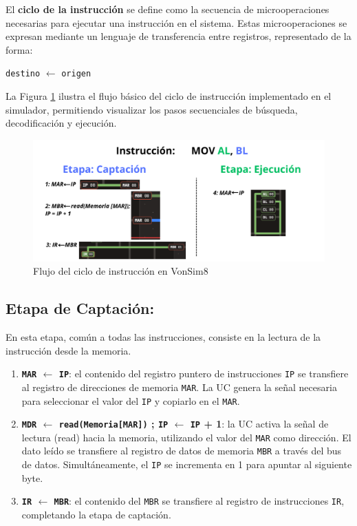 \documentclass[12pt,oneside]{templates/unerthesis}
\providecommand{\tightlist}{%
  \setlength{\itemsep}{0pt}\setlength{\parskip}{0pt}}
\begin{document}
El \textbf{ciclo de la instrucción} se define como la secuencia de microoperaciones necesarias para ejecutar una instrucción en el sistema. Estas microoperaciones se expresan mediante un lenguaje de transferencia entre registros, representado de la forma:

\texttt{destino} \(\leftarrow\) \texttt{origen}

La Figura \ref{fig:flujoCicloInstruccion} ilustra el flujo básico del ciclo de instrucción implementado en el simulador, permitiendo visualizar los pasos secuenciales de búsqueda, decodificación y ejecución.

\begin{figure}

{\centering \includegraphics[width=0.85\linewidth]{images/cicloinstruccion2} 

}

\caption{Flujo del ciclo de instrucción en VonSim8}\label{fig:flujoCicloInstruccion}
\end{figure}

\hypertarget{etapa-de-captaciuxf3n}{%
\subsection{Etapa de Captación:}\label{etapa-de-captaciuxf3n}}

En esta etapa, común a todas las instrucciones, consiste en la lectura de la instrucción desde la memoria.

\begin{enumerate}
\def\labelenumi{\arabic{enumi}.}
\tightlist
\item
  \textbf{\texttt{MAR} \(\leftarrow\) \texttt{IP}}:
  el contenido del registro puntero de instrucciones \texttt{IP} se transfiere al registro de direcciones de memoria \texttt{MAR}. La UC genera la señal necesaria para seleccionar el valor del \texttt{IP} y copiarlo en el \texttt{MAR}.
\item
  \textbf{\texttt{MDR} \(\leftarrow\) \texttt{read(Memoria{[}MAR{]})} ; \texttt{IP} \(\leftarrow\) \texttt{IP} + 1}:
  la UC activa la señal de lectura (read) hacia la memoria, utilizando el valor del \texttt{MAR} como dirección. El dato leído se transfiere al registro de datos de memoria \texttt{MBR} a través del bus de datos. Simultáneamente, el \texttt{IP} se incrementa en 1 para apuntar al siguiente byte.
\item
  \textbf{\texttt{IR} \(\leftarrow\) \texttt{MBR}}:
  el contenido del \texttt{MBR} se transfiere al registro de instrucciones \texttt{IR}, completando la etapa de captación.
\end{enumerate}
\end{document}
